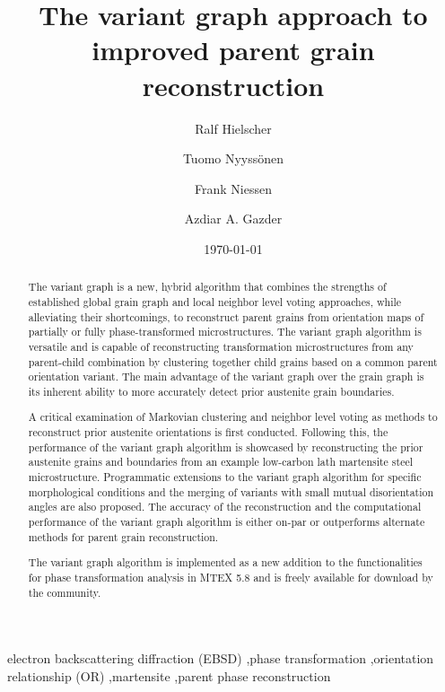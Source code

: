 \documentclass{elsarticle}
\title{The variant graph approach to improved parent grain reconstruction}
\date{\today}
\author[1]{Ralf Hielscher}
\author[2]{Tuomo Nyyssönen\corref{cor1}}
\author[3]{Frank Niessen}
\author[4]{Azdiar A. Gazder}
\numberwithin{equation}{section}
\begin{document}
\begin{abstract}
The variant graph is a new, hybrid algorithm that combines the strengths of established global grain graph and local neighbor level voting approaches, while alleviating their shortcomings, to reconstruct parent grains from orientation maps of partially or fully phase-transformed microstructures. The variant graph algorithm is versatile and is capable of reconstructing transformation microstructures from any parent-child combination by clustering together child grains based on a common parent orientation variant. The main advantage of the variant graph over the grain graph is its inherent ability to more accurately detect prior austenite grain boundaries.

A critical examination of Markovian clustering and neighbor level voting as methods to reconstruct prior austenite orientations is first conducted. Following this, the performance of the variant graph algorithm is showcased by reconstructing the prior austenite grains and boundaries from an example low-carbon lath martensite steel microstructure. Programmatic extensions to the variant graph algorithm for specific morphological conditions and the merging of variants with small mutual disorientation angles are also proposed. The accuracy of the reconstruction and the computational performance of the variant graph algorithm is either on-par or outperforms alternate methods for parent grain reconstruction. 

The variant graph algorithm is implemented as a new addition to the functionalities for phase transformation analysis in MTEX 5.8 and is freely available for download by the community.
\end{abstract}

\begin{keyword}
electron backscattering diffraction (EBSD) \sep phase transformation \sep orientation 
relationship (OR) \sep martensite \sep parent phase reconstruction
\end{keyword}


\maketitle
\end{document}
